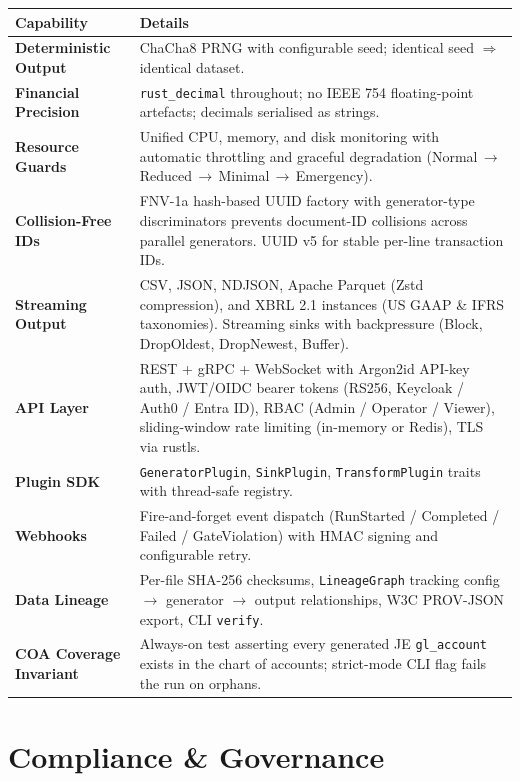 \documentclass[11pt,a4paper]{article}
\begin{document}
\renewcommand{\arraystretch}{1.2}
\begin{tabularx}{\textwidth}{@{}>{\bfseries\color{brand}}l X@{}}
\toprule
\textbf{Capability} & \textbf{Details} \\
\midrule
Deterministic Output & ChaCha8 PRNG with configurable seed; identical seed $\Rightarrow$ identical dataset. \\
Financial Precision  & \texttt{rust\_decimal} throughout; no IEEE 754 floating-point artefacts; decimals serialised as strings. \\
Resource Guards      & Unified CPU, memory, and disk monitoring with automatic throttling and graceful degradation (Normal\,$\to$\,Reduced\,$\to$\,Minimal\,$\to$\,Emergency). \\
Collision-Free IDs   & FNV-1a hash-based UUID factory with generator-type discriminators prevents document-ID collisions across parallel generators. UUID v5 for stable per-line transaction IDs. \\
Streaming Output     & CSV, JSON, NDJSON, Apache Parquet (Zstd compression), and XBRL 2.1 instances (US GAAP \& IFRS taxonomies). Streaming sinks with backpressure (Block, DropOldest, DropNewest, Buffer). \\
API Layer            & REST + gRPC + WebSocket with Argon2id API-key auth, JWT/OIDC bearer tokens (RS256, Keycloak / Auth0 / Entra ID), RBAC (Admin / Operator / Viewer), sliding-window rate limiting (in-memory or Redis), TLS via rustls. \\
Plugin SDK           & \texttt{GeneratorPlugin}, \texttt{SinkPlugin}, \texttt{TransformPlugin} traits with thread-safe registry. \\
Webhooks             & Fire-and-forget event dispatch (RunStarted / Completed / Failed / GateViolation) with HMAC signing and configurable retry. \\
Data Lineage         & Per-file SHA-256 checksums, \texttt{LineageGraph} tracking config $\to$ generator $\to$ output relationships, W3C PROV-JSON export, CLI \texttt{verify}. \\
COA Coverage Invariant & Always-on test asserting every generated JE \texttt{gl\_account} exists in the chart of accounts; strict-mode CLI flag fails the run on orphans. \\
\bottomrule
\end{tabularx}

\newpage
\section{Compliance \& Governance}
\end{document}

